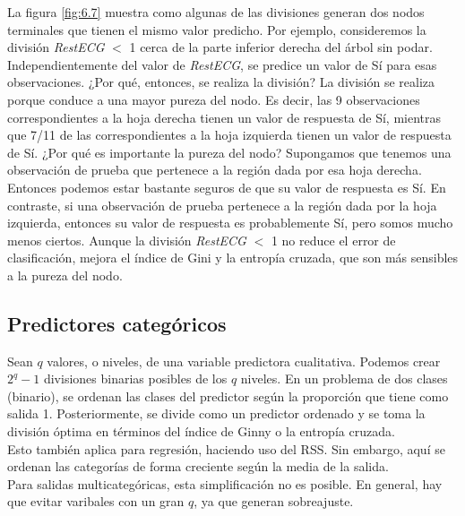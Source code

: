 La figura \ref{fig:6.7} muestra como algunas de las divisiones generan dos nodos terminales que tienen el mismo valor predicho. Por ejemplo, consideremos la división \textit{RestECG} $<$ 1 cerca de la parte inferior derecha del árbol sin podar. Independientemente del valor de \textit{RestECG}, se predice un valor de Sí para esas observaciones. ¿Por qué, entonces, se realiza la división? La división se realiza porque conduce a una mayor pureza del nodo. Es decir, las 9 observaciones correspondientes a la hoja derecha tienen un valor de respuesta de Sí, mientras que 7/11 de las correspondientes a la hoja izquierda tienen un valor de respuesta de Sí. ¿Por qué es importante la pureza del nodo? Supongamos que tenemos una observación de prueba que pertenece a la región dada por esa hoja derecha. Entonces podemos estar bastante seguros de que su valor de respuesta es Sí. En contraste, si una observación de prueba pertenece a la región dada por la hoja izquierda, entonces su valor de respuesta es probablemente Sí, pero somos mucho menos ciertos. Aunque la división \textit{RestECG} $<$ 1 no reduce el error de clasificación, mejora el índice de Gini y la entropía cruzada, que son más sensibles a la pureza del nodo.

\subsection{Predictores categóricos}

Sean $q$ valores, o niveles, de una variable predictora cualitativa. Podemos crear $2^q - 1$ divisiones binarias posibles de los $q$ niveles. En un problema de dos clases (binario), se ordenan las clases del predictor según la proporción que tiene como salida 1. Posteriormente, se divide como un predictor ordenado y se toma la división óptima en términos del índice de Ginny o la entropía cruzada. \\

Esto también aplica para regresión, haciendo uso del RSS. Sin embargo, aquí se ordenan las categorías de forma creciente según la media de la salida. \\

Para salidas multicategóricas, esta simplificación no es posible. En general, hay que evitar varibales con un gran $q$, ya que generan sobreajuste.


